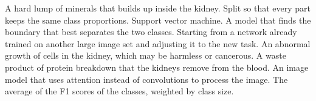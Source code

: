 {\begin{description}[style=sameline, leftmargin=3.6cm, labelwidth=3.4cm, labelsep=0.2cm, itemsep=1pt, parsep=0pt, topsep=2pt, font=\normalfont\bfseries]
     A hard lump of minerals that builds up inside the kidney.
     Split so that every part keeps the same class proportions.
     Support vector machine. A model that finds the boundary that best separates the two classes.
     Starting from a network already trained on another large image set and adjusting it to the new task.
     An abnormal growth of cells in the kidney, which may be harmless or cancerous.
     A waste product of protein breakdown that the kidneys remove from the blood.
     An image model that uses attention instead of convolutions to process the image.
     The average of the F1 scores of the classes, weighted by class size.
\end{description}
}
